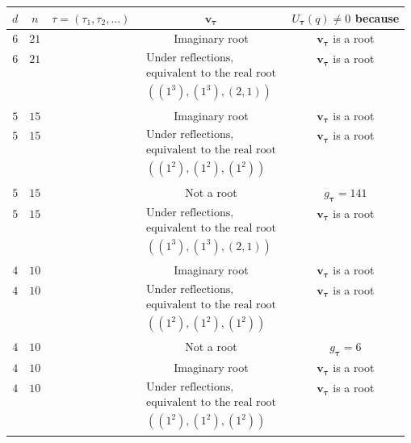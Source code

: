 \documentclass[11pt]{article}
\theoremstyle{definition}
\numberwithin{equation}{section}
\newcommand{\bv}{{\mathbf{v}}}
\newcommand{\tauhat}{{\boldsymbol \tau}}
\begin{document}
\begin{figure}[H]
	\centering
	\begin{tabular}{|c|c|c|c|c|}
		\hline
		$d$& $n$ & $\tau=(\tau_1,\tau_2,\dots)$ & $\bv_\tauhat$ &$U_{\tauhat}(q)\neq 0$ because \\
		\hline\hline
		$6$&$21$ & \makecell{$\substack{    \tau_1 \leq  15\ \text{except}\ (15,6)}$} &
		Imaginary root & $\bv_\tauhat$ is a root \\
		\hline
		$6$&$21$ & \makecell{$\substack{ (15,6)}$} &
		$\substack{\text{Under reflections,}\\ \text{equivalent to the real root} \\ ((1^3),(1^3),(2,1)) }$ & $\bv_\tauhat$ is a root \\
		\hline\hline
		$5$&$15$ & \makecell{$\substack{   \tau_1 \leq  10 \\ \text{except}\ (9,6),(10,4,1),(10,5)}$} &
		Imaginary root &$\bv_\tauhat$ is a root \\
		\hline
		$5$&$15$ & \makecell{$\substack{  (10,4,1)}$} &
		$\substack{\text{Under reflections,}\\ \text{equivalent to the real root} \\ ((1^2),(1^2),(1^2)) }$ &$\bv_\tauhat$ is a root \\
		\hline
		$5$&$15$ & \makecell{$\substack{  (10,5)}$} &
		Not a root& $g_\tauhat=141$ \\
		\hline
		$5$&$15$ & \makecell{$\substack{ (9,6)}$} &
		$\substack{\text{Under reflections,}\\ \text{equivalent to the real root} \\ ((1^3),(1^3),(2,1)) }$&$\bv_\tauhat$ is a root \\
		\hline\hline
		$4$&$10$ & \makecell{$\substack{\tau_1\leq 5\  \text{except}\ (5,4,1),(5^2) }$} &
		Imaginary root &$\bv_\tauhat$ is a root  \\
		\hline
		$4$&$10$ & \makecell{$\substack{(5,4,1)}$} &
		$\substack{\text{Under reflections,}\\ \text{equivalent to the real root} \\ ((1^2),(1^2),(1^2)) }$ &$\bv_\tauhat$ is a root \\
		\hline
		$4$&$10$ & \makecell{$\substack{(5^2)}$} &
		Not a root &$g_\tauhat=6$\\
		\hline
		$4$&$10$ & \makecell{$\substack{(6,1^4)}$} &
		Imaginary root &$\bv_\tauhat$ is a root \\
		\hline
		$4$&$10$ & \makecell{$\substack{(6,2,1^2)}$} &
		$\substack{\text{Under reflections,}\\ \text{equivalent to the real root} \\ ((1^2),(1^2),(1^2)) }$ &$\bv_\tauhat$ is a root \\

\end{tabular}
\end{figure}
\end{document}
